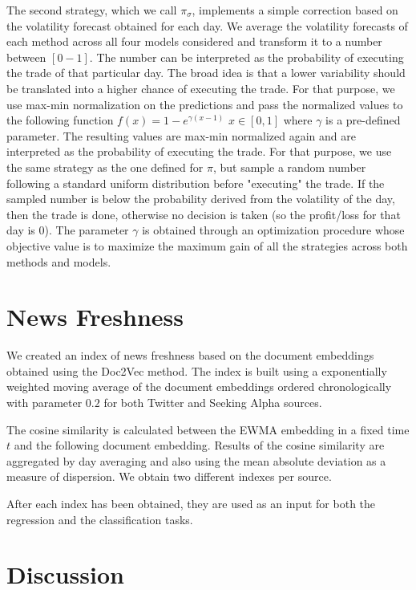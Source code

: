 \documentclass[a4paper, 12pt]{report}
\begin{document}
    The second strategy, which we call $\pi_\sigma$, implements a simple correction based on the volatility forecast obtained for each day. We average the volatility forecasts of each method across all four models considered and transform it to a number between $[0-1]$. The number can be interpreted as the probability of executing the trade of that particular day. The broad idea is that a lower variability should be translated into a higher chance of executing the trade. For that purpose, we use max-min normalization on the predictions and pass the normalized values to the following function $f(x)=1-e^{\gamma(x-1)}$ $x \in [0,1]$ where $\gamma$ is a pre-defined parameter. The resulting values are max-min normalized again and are interpreted as the probability of executing the trade. For that purpose, we use the same strategy as the one defined for $\pi$, but sample a random number following a standard uniform distribution before "executing" the trade. If the sampled number is below the probability derived from the volatility of the day, then the trade is done, otherwise no decision is taken (so the profit/loss for that day is $0$). The parameter $\gamma$ is obtained through an optimization procedure whose objective value is to maximize the maximum gain of all the strategies across both methods and models.
    
    \section{News Freshness}
    \label{NF}
    We created an index of news freshness based on the document embeddings obtained using the Doc2Vec method. The index is built using a exponentially weighted moving average of the document embeddings ordered chronologically with parameter $0.2$ for both Twitter and Seeking Alpha sources. 
    
    The cosine similarity is calculated between the EWMA embedding in a fixed time $t$ and the following document embedding. Results of the cosine similarity are aggregated by day averaging and also using the mean absolute deviation as a measure of dispersion. We obtain two different indexes per source. 
    
    After each index has been obtained, they are used as an input for both the regression and the classification tasks. 
    
    \section{Discussion}
    
\end{document}
